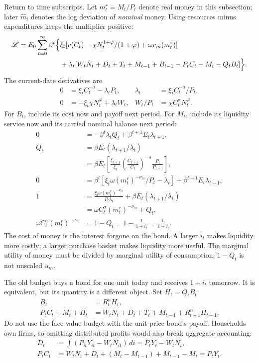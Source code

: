 Return to time subscripts. Let $m_t^r=M_t/P_t$ denote real money in this
subsection; later $\hat m_t$ denotes the log deviation of \emph{nominal} money.
Using resources minus expenditures keeps the multiplier positive:
\begin{align}
 \mathcal L=E_0\sum_{t=0}^\infty\beta^t\Big\{&\xi_t
 [v(C_t)-\chi N_t^{1+\varphi}/(1+\varphi)+\omega v_m(m_t^r)]\notag\\
 &+\lambda_t[W_tN_t+D_t+T_t+M_{t-1}+B_{t-1}
                  -P_tC_t-M_t-Q_tB_t]\Big\}.
\end{align}
The current-date derivatives are
\begin{align}
 0&=\xi_t C_t^{-\sigma}-\lambda_tP_t,
 &\lambda_t&=\xi_t C_t^{-\sigma}/P_t,\\
 0&=-\xi_t\chi N_t^\varphi+\lambda_tW_t,
 &W_t/P_t&=\chi C_t^\sigma N_t^\varphi.\label{eq:nk-labor}
\end{align}
For $B_t$, include its cost now and payoff next period. For $M_t$, include
its liquidity service now and its carried nominal balance next period:
\begin{align}
 0&=-\beta^t\lambda_tQ_t+\beta^{t+1}E_t\lambda_{t+1},\\
 Q_t&=\beta E_t(\lambda_{t+1}/\lambda_t)\\
 &=\beta E_t\left[\frac{\xi_{t+1}}{\xi_t}
       \left(\frac{C_{t+1}}{C_t}\right)^{-\sigma}\frac{P_t}{P_{t+1}}\right],
       \label{eq:nk-euler-exact}\\
 0&=\beta^t[\xi_t\omega(m_t^r)^{-\nu_m}/P_t-\lambda_t]
              +\beta^{t+1}E_t\lambda_{t+1},\\
 1&=\frac{\xi_t\omega(m_t^r)^{-\nu_m}}{P_t\lambda_t}
                  +\beta E_t(\lambda_{t+1}/\lambda_t)\\
  &=\omega C_t^\sigma(m_t^r)^{-\nu_m}+Q_t,\\
 \omega C_t^\sigma(m_t^r)^{-\nu_m}
 &=1-Q_t=1-\frac1{1+i_t}=\frac{i_t}{1+i_t}.\label{eq:nk-money-exact}
\end{align}
The cost of money is the interest forgone on the bond. A larger $i_t$ makes
liquidity more costly; a larger purchase basket makes liquidity more useful.
The marginal utility of money must be divided by marginal utility of consumption;
$1-Q_t$ is not unscaled $u_m$.

The old budget buys a bond for one unit today and receives $1+i_t$ tomorrow.
It is equivalent, but its quantity is a different object. Set $H_t=Q_tB_t$:
\begin{align}
 B_t&=R_t^nH_t,\\
 P_tC_t+M_t+H_t
 &=W_tN_t+D_t+T_t+M_{t-1}+R_{t-1}^nH_{t-1}.
\end{align}
Do not use the face-value budget with the unit-price bond's payoff. Households
own firms, so omitting distributed profits would also break aggregate accounting:
\begin{align}
 D_t&=\int(P_{it}Y_{it}-W_tN_{it})\,di=P_tY_t-W_tN_t,\\
 P_tC_t&=W_tN_t+D_t+(M_t-M_{t-1})+M_{t-1}-M_t=P_tY_t.
\end{align}

